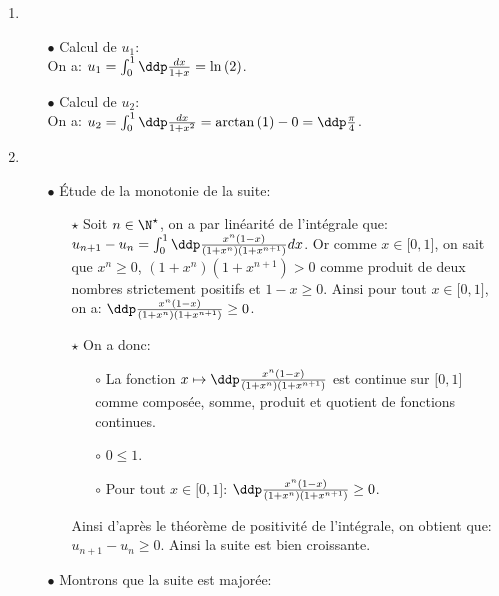 \documentclass[a4paper, 11pt,reqno]{article}
\begin{document}
\begin{correction}
\begin{enumerate}
		      \begin{enumerate}
			      \item
			            \begin{itemize}
				            \item[$\bullet$] Calcul de $u_1$:\\
				                  \noindent On a: $u_1=\int_0^1 \ddp\frac{dx}{1+x}=\ln{(2)}$.
				            \item[$\bullet$] Calcul de $u_2$:\\
				                  \noindent On a: $u_2=\int_0^1 \ddp\frac{dx}{1+x^2}=\arctan{(1)}-0=\ddp\frac{\pi}{4}$.
			            \end{itemize}
			      \item
			            \begin{itemize}
				            \item[$\bullet$] \'Etude de la monotonie de la suite:
				                  \begin{itemize}
					                  \item[$\star$] Soit $n\in\N^{\star}$, on a par lin\'earit\'e de l'int\'egrale que: $u_{n+1}-u_n=\int_0^1 \ddp\frac{x^n(1-x)}{(1+x^n)(1+x^{n+1})} dx$. Or comme $x\in\lbrack 0,1\rbrack$, on sait que $x^n\geq 0$, $(1+x^n)(1+x^{n+1})>0$ comme produit de deux nombres strictement positifs et $1-x\geq 0$. Ainsi pour tout $x\in\lbrack 0,1\rbrack$, on a: $ \ddp\frac{x^n(1-x)}{(1+x^n)(1+x^{n+1})} \geq 0$.
					                  \item[$\star$] On a donc:
					                        \begin{itemize}
						                        \item[$\circ$] La fonction $x\mapsto  \ddp\frac{x^n(1-x)}{(1+x^n)(1+x^{n+1})} $ est continue sur $\lbrack 0,1\rbrack$ comme compos\'ee, somme, produit et quotient de fonctions continues.
						                        \item[$\circ$] $0\leq 1$.
						                        \item[$\circ$] Pour tout $x\in\lbrack 0,1\rbrack$: $ \ddp\frac{x^n(1-x)}{(1+x^n)(1+x^{n+1})} \geq 0$.
					                        \end{itemize}
					                        Ainsi d'apr\`{e}s le th\'eor\`{e}me de positivit\'e de l'int\'egrale, on obtient que: $u_{n+1}-u_n\geq 0$. Ainsi la suite est bien croissante.
				                  \end{itemize}
				            \item[$\bullet$] Montrons que la suite est major\'ee:\\

\end{itemize}
\end{enumerate}
\end{enumerate}
\end{correction}
\end{document}
